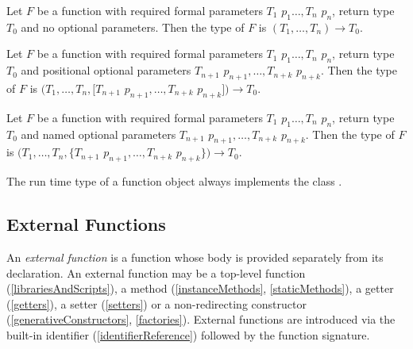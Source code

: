 \documentclass{article}
\begin{document}
\LMHash{}
Let $F$ be a function with required formal parameters $T_1$ $p_1 \ldots, T_n$ $p_n$, return type $T_0$ and no optional parameters. Then the type of $F$ is $(T_1 ,\ldots, T_n) \rightarrow T_0$.

\LMHash{}
Let $F$ be a function with required formal parameters $T_1$ $p_1 \ldots, T_n$ $p_n$, return type $T_0$ and positional optional parameters $T_{n+1}$ $p_{n+1}, \ldots, T_{n+k}$ $ p_{n+k}$. Then the type of $F$ is $(T_1 ,\ldots, T_n, [T_{n+1}$ $p_{n+1}, \ldots, T_{n+k}$  $p_{n+k}]) \rightarrow T_0$.

\LMHash{}
Let $F$ be a function with required formal parameters $T_1$ $p_1 \ldots, T_n$ $p_n$, return type $T_0$ and named optional parameters $T_{n+1}$ $p_{n+1}, \ldots, T_{n+k}$ $ p_{n+k}$. Then the type of $F$ is $(T_1 ,\ldots, T_n, \{T_{n+1}$ $p_{n+1}, \ldots, T_{n+k}$  $p_{n+k}\}) \rightarrow T_0$.

\LMHash{}
The run time type of a function object always implements the class .



\subsection{External Functions}

\LMHash{}
An {\em external function} is a function whose body is provided separately from its declaration. An external function may be a top-level function (\ref{librariesAndScripts}), a method (\ref{instanceMethods}, \ref{staticMethods}), a getter (\ref{getters}), a setter (\ref{setters}) or a non-redirecting constructor (\ref{generativeConstructors}, \ref{factories}). External functions are introduced via the built-in identifier \EXTERNAL{}  (\ref{identifierReference}) followed by the function signature.
\end{document}
